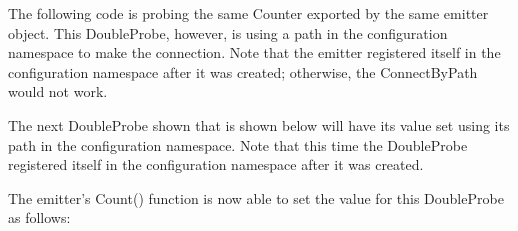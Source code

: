 \documentclass[letterpaper,10pt,english]{sphinxmanual}
\begin{document}
The following code is probing the same Counter exported by the same
emitter object.  This DoubleProbe, however, is using a path in the
configuration namespace to make the connection.  Note that the emitter
registered itself in the configuration namespace after it was created;
otherwise, the ConnectByPath would not work.

\begin{sphinxVerbatim}[commandchars=\\\{\}]
    

 
\end{sphinxVerbatim}

The next DoubleProbe shown that is shown below will have its value set using
its path in the configuration namespace.  Note that this time the
DoubleProbe registered itself in the configuration namespace after it was
created.

\begin{sphinxVerbatim}[commandchars=\\\{\}]
    
 

    
\end{sphinxVerbatim}

The emitter’s Count() function is now able to set the value for this DoubleProbe as follows:

\begin{sphinxVerbatim}[commandchars=\\\{\}]
 
    
    
\end{sphinxVerbatim}
\end{document}
